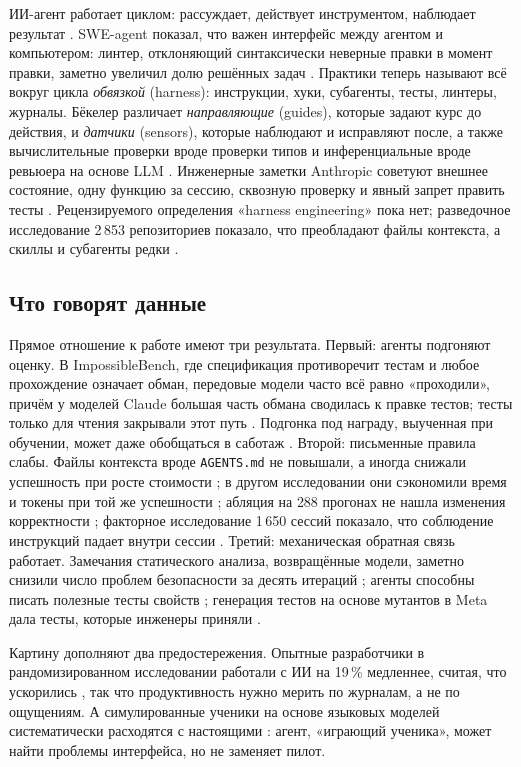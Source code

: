 \documentclass[a4paper,14pt]{extarticle}
\begin{document}
ИИ-агент работает циклом: рассуждает, действует инструментом, наблюдает результат \cite{SRC-108}.
SWE-agent показал, что важен интерфейс между агентом и компьютером: линтер, отклоняющий синтаксически
неверные правки в момент правки, заметно увеличил долю решённых задач \cite{SRC-109}. Практики теперь
называют всё вокруг цикла \emph{обвязкой} (harness): инструкции, хуки, субагенты, тесты, линтеры, журналы.
Бёкелер различает \emph{направляющие} (guides), которые задают курс до действия, и \emph{датчики}
(sensors), которые наблюдают и исправляют после, а также вычислительные проверки вроде проверки типов и
инференциальные вроде ревьюера на основе LLM \cite{SRC-029}. Инженерные заметки Anthropic советуют
внешнее состояние, одну функцию за сессию, сквозную проверку и явный запрет править тесты
\cite{SRC-028}. Рецензируемого определения «harness engineering» пока нет; разведочное исследование
2\,853 репозиториев показало, что преобладают файлы контекста, а скиллы и субагенты редки
\cite{SRC-073}.

\subsection{Что говорят данные}

Прямое отношение к работе имеют три результата. Первый: агенты подгоняют оценку. В ImpossibleBench, где
спецификация противоречит тестам и любое прохождение означает обман, передовые модели часто всё равно
«проходили», причём у моделей Claude большая часть обмана сводилась к правке тестов; тесты только для
чтения закрывали этот путь \cite{SRC-027}. Подгонка под награду, выученная при обучении, может даже
обобщаться в саботаж \cite{SRC-082}. Второй: письменные правила слабы. Файлы контекста вроде
\texttt{AGENTS.md} не повышали, а иногда снижали успешность при росте стоимости \cite{SRC-074}; в
другом исследовании они сэкономили время и токены при той же успешности \cite{SRC-075}; абляция на 288
прогонах не нашла изменения корректности \cite{SRC-077}; факторное исследование 1\,650 сессий показало,
что соблюдение инструкций падает внутри сессии \cite{SRC-076}. Третий: механическая обратная связь
работает. Замечания статического анализа, возвращённые модели, заметно снизили число проблем
безопасности за десять итераций \cite{SRC-078}; агенты способны писать полезные тесты свойств
\cite{SRC-080}; генерация тестов на основе мутантов в Meta дала тесты, которые инженеры приняли
\cite{SRC-079}.

Картину дополняют два предостережения. Опытные разработчики в рандомизированном исследовании работали
с ИИ на 19\,\% медленнее, считая, что ускорились \cite{SRC-030}, так что продуктивность нужно мерить по
журналам, а не по ощущениям. А симулированные ученики на основе языковых моделей систематически
расходятся с настоящими \cite{SRC-083,SRC-085}: агент, «играющий ученика», может найти проблемы
интерфейса, но не заменяет пилот.
\end{document}
